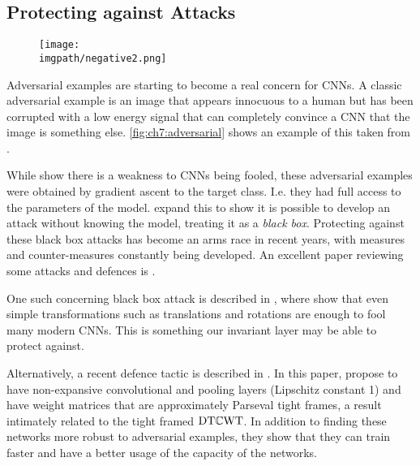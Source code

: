 \subsection{Protecting against Attacks}
\begin{figure}
  \centering
  \texttt{[image: \\imgpath/negative2.png]}
  \label{fig:ch7:adversarial}
\end{figure}
Adversarial examples are starting to become a real concern for CNNs. A classic
adversarial example is an image that appears innocuous to a human but has been
corrupted with a low energy signal that can completely convince a CNN that the
image is something else. \autoref{fig:ch7:adversarial} shows an example of this
taken from \cite{szegedy_intriguing_2014}.

While \citeauthor{szegedy_intriguing_2014} \cite{szegedy_intriguing_2014} show
there is a weakness to CNNs being fooled, these adversarial examples were
obtained by gradient ascent to the target class. I.e. they had full access to
the parameters of the model. \citeauthor{papernot_practical_2017} \cite{papernot_practical_2017} expand this to show
it is possible to develop an attack without knowing the model, treating it as a
\emph{black box}. Protecting against these black box attacks has become an
arms race in recent years, with measures and counter-measures constantly
being developed. An excellent paper reviewing some attacks and
defences is \cite{carlini_adversarial_2017}.

One such concerning black box attack is described in \cite{engstrom_rotation_2017}, where
\citeauthor{engstrom_rotation_2017} show that even simple transformations such
as translations and rotations are enough to fool many modern CNNs. This is
something our invariant layer may be able to protect against.

Alternatively, a recent defence tactic is described in \cite{cisse_parseval_2017}. In
this paper, \citeauthor{cisse_parseval_2017} propose to have non-expansive
convolutional and pooling layers (Lipschitz constant 1) and have weight matrices
that are approximately Parseval tight frames, a result intimately related to
the tight framed $\mathrm{DT}\mathbb{C}\mathrm{WT}$. In addition to finding these
networks more robust to adversarial examples, they show that they can train
faster and have a better usage of the capacity of the networks.

